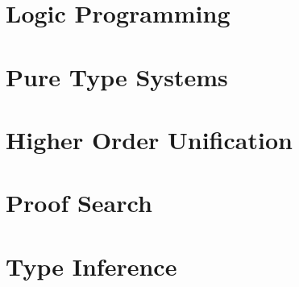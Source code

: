 \section{Logic Programming}

\section{Pure Type Systems}

\section{Higher Order Unification}

\section{Proof Search}

\section{Type Inference}